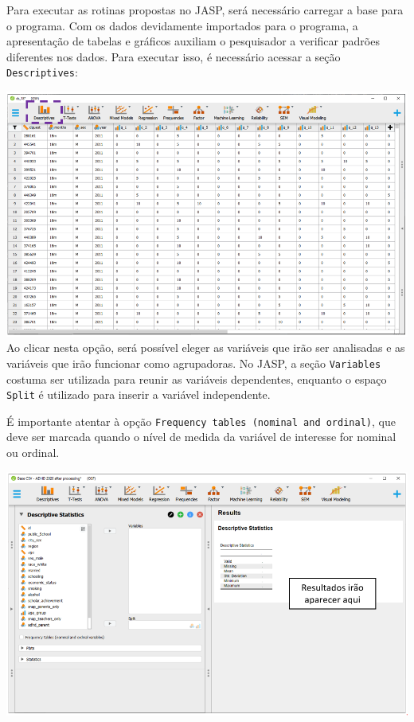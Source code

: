 \documentclass[
]{book}
\begin{document}
Para executar as rotinas propostas no JASP, será necessário carregar a base para o programa. Com os dados devidamente importados para o programa, a apresentação de tabelas e gráficos auxiliam o pesquisador a verificar padrões diferentes nos dados. Para executar isso, é necessário acessar a seção \texttt{Descriptives}:

\includegraphics{./img/jasp_descriptives.png}
Ao clicar nesta opção, será possível eleger as variáveis que irão ser analisadas e as variáveis que irão funcionar como agrupadoras. No JASP, a seção \texttt{Variables} costuma ser utilizada para reunir as variáveis dependentes, enquanto o espaço \texttt{Split} é utilizado para inserir a variável independente.

É importante atentar à opção \texttt{Frequency\ tables\ (nominal\ and\ ordinal)}, que deve ser marcada quando o nível de medida da variável de interesse for nominal ou ordinal.

\includegraphics{./img/cap_x2_primeira_tabela.png}
\end{document}
